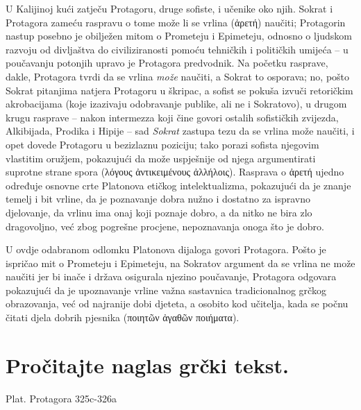 U Kalijinoj kući zatječu Protagoru, druge sofiste, i učenike oko njih. Sokrat i Protagora zameću raspravu o tome može li se vrlina (\textgreek[variant=ancient]{ἀρετή}) naučiti; Protagorin nastup posebno je obilježen mitom o Prometeju i Epimeteju, odnosno o ljudskom razvoju od divljaštva do civiliziranosti pomoću tehničkih i političkih umijeća – u poučavanju potonjih upravo je Protagora predvodnik. Na početku rasprave, dakle, Protagora tvrdi da se vrlina \textit{može} naučiti, a Sokrat to osporava; no, pošto Sokrat pitanjima natjera Protagoru u škripac, a sofist se pokuša izvuči retoričkim akrobacijama (koje izazivaju odobravanje publike, ali ne i Sokratovo), u drugom krugu rasprave -- nakon intermezza koji čine govori ostalih sofističkih zvijezda, Alkibijada, Prodika i Hipije – sad \textit{Sokrat} zastupa tezu da se vrlina može naučiti, i opet dovede Protagoru u bezizlaznu poziciju; tako porazi sofista njegovim vlastitim oružjem, pokazujući da može uspješnije od njega argumentirati suprotne strane spora (\textgreek[variant=ancient]{λόγους ἀντικειμένους ἀλλήλοις}). Rasprava o \textgreek[variant=ancient]{ἀρετή} ujedno određuje osnovne crte Platonova etičkog intelektualizma, pokazujući da je znanje temelj i bit vrline, da je poznavanje dobra nužno i dostatno za ispravno djelovanje, da vrlinu ima onaj koji poznaje dobro, a da nitko ne bira zlo dragovoljno, već zbog pogrešne procjene, nepoznavanja onoga što je dobro.

U ovdje odabranom odlomku Platonova dijaloga govori Protagora. Pošto je ispričao mit o Prometeju i Epimeteju, na Sokratov argument da se vrlina ne može naučiti jer bi inače i država osigurala njezino poučavanje, Protagora odgovara pokazujući da je upoznavanje vrline važna sastavnica tradicionalnog grčkog obrazovanja, već od najranije dobi djeteta, a osobito kod učitelja, kada se počnu čitati djela dobrih pjesnika (\textgreek[variant=ancient]{ποιητῶν ἀγαθῶν ποιήματα}).

\newpage

\section*{Pročitajte naglas grčki tekst.}

Plat. Protagora 325c-326a


\medskip


